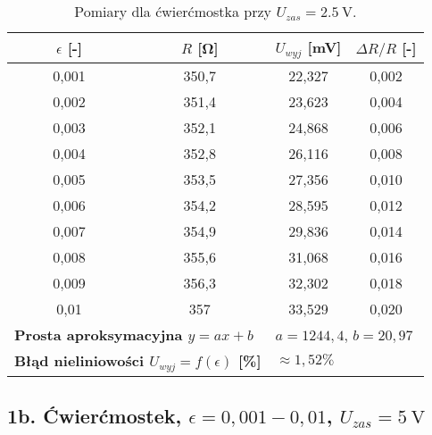 \documentclass[12pt, a4paper]{article}
\begin{document}
	\begin{table}[H]
		\centering
		\caption{Pomiary dla ćwierćmostka przy $U_{zas} = \SI{2.5}{\volt}$.}
		\begin{tabular}{cccc}
			\toprule
			$\epsilon$ [-] & $R$ [\si{\ohm}] & $U_{wyj}$ [\si{\milli\volt}] & $\Delta R/R$ [-] \\
			\midrule
			0,001 & 350,7 & 22,327 & 0,002 \\
			0,002 & 351,4 & 23,623 & 0,004 \\
			0,003 & 352,1 & 24,868 & 0,006 \\
			0,004 & 352,8 & 26,116 & 0,008 \\
			0,005 & 353,5 & 27,356 & 0,010 \\
			0,006 & 354,2 & 28,595 & 0,012 \\
			0,007 & 354,9 & 29,836 & 0,014 \\
			0,008 & 355,6 & 31,068 & 0,016 \\
			0,009 & 356,3 & 32,302 & 0,018 \\
			0,01 & 357 & 33,529 & 0,020 \\
			\midrule
			\multicolumn{2}{l}{\textbf{Prosta aproksymacyjna $y = ax + b$}} & \multicolumn{2}{l}{$a = 1244,4$, $b = 20,97$} \\
			\multicolumn{2}{l}{\textbf{Błąd nieliniowości $U_{wyj} = f(\epsilon)$ [\%]}} & \multicolumn{2}{l}{$\approx 1,52 \%$} \\
			\bottomrule
		\end{tabular}
	\end{table}
	
	\subsection{1b. Ćwierćmostek, $\epsilon = 0,001-0,01$, $U_{zas} = \SI{5}{\volt}$}
	
\end{document}
